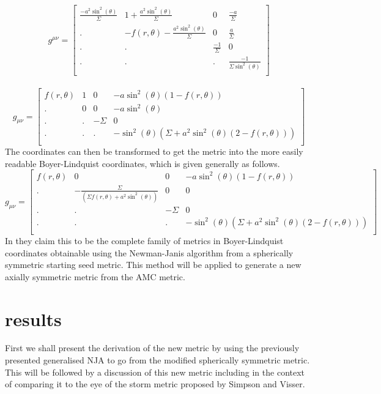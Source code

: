 \documentclass[12pt]{iopart}
\begin{document}
\[
g^{\mu \nu}=
  \left[ {\begin{array}{ccccc}
    \frac{-a^2\sin^2(\theta)}{\Sigma} & 1+\frac{a^2\sin^2(\theta)}{\Sigma} & 0 & \frac{-a}{\Sigma}\\
    . & -f(r,\theta)-\frac{a^2\sin^2(\theta)}{\Sigma} & 0 & \frac{a}{\Sigma}\\
    . & . & \frac{-1}{\Sigma} & 0\\
    . & . & . & \frac{-1}{\Sigma \sin^2(\theta)}\\
  \end{array} } \right]
\]
\\
\[
g_{\mu \nu}=
  \left[ {\begin{array}{ccccc}
 f(r,\theta) & 1 & 0 & -a\sin^2(\theta)(1-f(r,\theta))\\
 . & 0 & 0 & -a\sin^2(\theta)\\
 . & . & -\Sigma & 0\\
 . & . & . & -\sin^2(\theta)(\Sigma+a^2\sin^2(\theta)(2-f(r,\theta)))\\
  \end{array} } \right]
\]
 The coordinates can then be transformed to get the metric into the more easily readable Boyer-Lindquist coordinates, which is given generally as follows.
\\
\[
   g_{\mu \nu}=
  \left[ {\begin{array}{ccccc}
 f(r,\theta) & 0 & 0 & -a\sin^2(\theta)(1-f(r,\theta))\\
 . & -\frac{\Sigma}{(\Sigma f(r,\theta)+a^2\sin^2(\theta))} & 0 & 0\\
 . & . & -\Sigma & 0\\
 . & . & . & -\sin^2(\theta)(\Sigma+a^2\sin^2(\theta)(2-f(r,\theta)))\\
  \end{array} } \right]
\]
 In \cite{Drake:1997hh} they claim this to be the complete family of metrics in Boyer-Lindquist coordinates obtainable using the Newman-Janis algorithm from a spherically symmetric starting seed metric. This method will be applied to generate a new axially symmetric metric from the AMC metric.
\section{results}
First we shall present the derivation of the new metric by using the previously presented generalised NJA to go from the modified spherically symmetric metric. This will be followed by a discussion of this new metric including in the context of comparing it to the eye of the storm metric proposed by Simpson and Visser.
\end{document}

